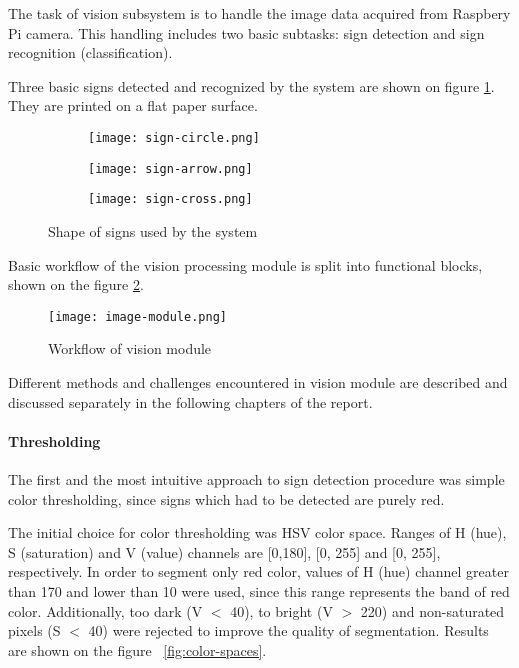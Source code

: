 
The task of vision subsystem is to handle the image data acquired from Raspbery Pi camera. This handling includes two basic subtasks: sign detection and sign recognition (classification).

Three basic signs detected and recognized by the system are shown on figure \ref{fig:raw-signs}. They are printed on a flat paper surface.

\begin{figure}[th!]
	\centering
	\begin{subfigure}[b]{0.2\textwidth}
		\centering
		\texttt{[image: sign-circle.png]}
	\end{subfigure}
	\begin{subfigure}[b]{0.4\textwidth}
		\centering
		\texttt{[image: sign-arrow.png]}
	\end{subfigure}
	\begin{subfigure}[b]{0.2\textwidth}
		\centering
		\texttt{[image: sign-cross.png]}
	\end{subfigure}
	\caption{Shape of signs used by the system}
	\label{fig:raw-signs}
\end{figure}

Basic workflow of the vision processing module is split into functional blocks, shown on the figure \ref{fig:vision-module-blocks}.

\begin{figure}[th!]
	\centering
		\texttt{[image: image-module.png]}
	\caption{Workflow of vision module}
	\label{fig:vision-module-blocks}
\end{figure}

Different methods and challenges encountered in vision module are described and discussed separately in the following chapters of the report.

\paragraph{Thresholding}

The first and the most intuitive approach to sign detection procedure was simple color thresholding, since signs which had to be detected are purely red.

The initial choice for color thresholding was HSV color space. Ranges of H (hue), S (saturation) and V (value) channels are [0,180], [0, 255] and [0, 255], respectively. In order to segment only red color, values of H (hue) channel greater than 170 and lower than 10 were used, since this range represents the band of red color. Additionally, too dark (V $ < $ 40), to bright (V $ > $ 220) and non-saturated pixels (S $ < $ 40) were rejected to improve the quality of segmentation. Results are shown on the figure ~\ref{fig:color-spaces}.

